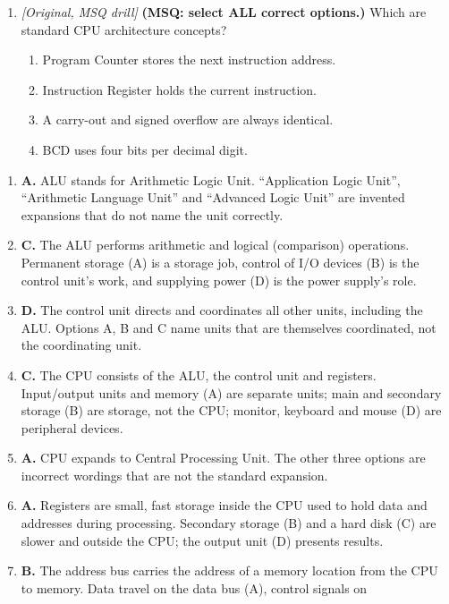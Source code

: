 \begin{enumerate}[label=\textbf{Q\arabic*.}, leftmargin=*]
\item \textit{[Original, MSQ drill]} \textbf{(MSQ: select ALL correct options.)} Which are standard CPU architecture concepts?
  \begin{enumerate}[label=\Alph*.]
\item Program Counter stores the next instruction address.
   \item Instruction Register holds the current instruction.
   \item A carry-out and signed overflow are always identical.
   \item BCD uses four bits per decimal digit.
  \end{enumerate}

\end{enumerate}
\begin{enumerate}[label=\textbf{Q\arabic*.}, leftmargin=*]
\item \textbf{A.} ALU stands for Arithmetic Logic Unit. ``Application Logic
  Unit'', ``Arithmetic Language Unit'' and ``Advanced Logic Unit'' are
  invented expansions that do not name the unit correctly.
\item \textbf{C.} The ALU performs arithmetic and logical (comparison)
  operations. Permanent storage (A) is a storage job, control of I/O devices
  (B) is the control unit's work, and supplying power (D) is the power
  supply's role.
\item \textbf{D.} The control unit directs and coordinates all other units,
  including the ALU. Options A, B and C name units that are themselves
  coordinated, not the coordinating unit.
\item \textbf{C.} The CPU consists of the ALU, the control unit and registers.
  Input/output units and memory (A) are separate units; main and secondary
  storage (B) are storage, not the CPU; monitor, keyboard and mouse (D) are
  peripheral devices.
\item \textbf{A.} CPU expands to Central Processing Unit. The other three
  options are incorrect wordings that are not the standard expansion.
\item \textbf{A.} Registers are small, fast storage inside the CPU used to
  hold data and addresses during processing. Secondary storage (B) and a hard
  disk (C) are slower and outside the CPU; the output unit (D) presents
  results.
\item \textbf{B.} The address bus carries the address of a memory location
  from the CPU to memory. Data travel on the data bus (A), control signals on

\end{enumerate}
